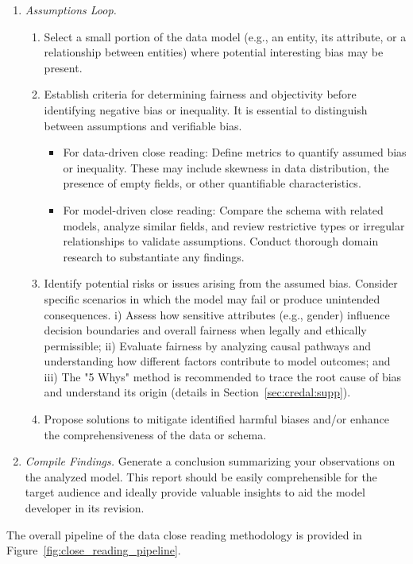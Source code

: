 \begin{enumerate}
\item \emph{Assumptions Loop.}
\begin{enumerate}
    \item Select a small portion of the data model (e.g., an entity, its attribute, or a relationship between entities) where potential interesting bias may be present.
    \item Establish criteria for determining fairness and objectivity before identifying negative bias or inequality. It is essential to distinguish between assumptions and verifiable bias.
    \begin{itemize}
        \item For data-driven close reading: Define metrics to quantify assumed bias or inequality. These may include skewness in data distribution, the presence of empty fields, or other quantifiable characteristics.
        \item For model-driven close reading: Compare the schema with related models, analyze similar fields, and review restrictive types or irregular relationships to validate assumptions. Conduct thorough domain research to substantiate any findings.
    \end{itemize}
    \item Identify potential risks or issues arising from the assumed bias. Consider specific scenarios in which the model may fail or produce unintended consequences.
        i) Assess how sensitive attributes (e.g., gender) influence decision boundaries and overall fairness when legally and ethically permissible;
        ii) Evaluate fairness by analyzing causal pathways and understanding how different factors contribute to model outcomes; and
        iii) The "5 Whys" method is recommended to trace the root cause of bias and understand its origin (details in Section~\ref{sec:credal:supp}). 
    \item Propose solutions to mitigate identified harmful biases and/or enhance the comprehensiveness of the data or schema.
\end{enumerate}

\item \emph{Compile Findings.}
    Generate a conclusion summarizing your observations on the analyzed model. This report should be easily comprehensible for the target audience and ideally provide valuable insights to aid the model developer in its revision.
\end{enumerate}


The overall pipeline of the data close reading methodology is provided in Figure~\ref{fig:close_reading_pipeline}.

